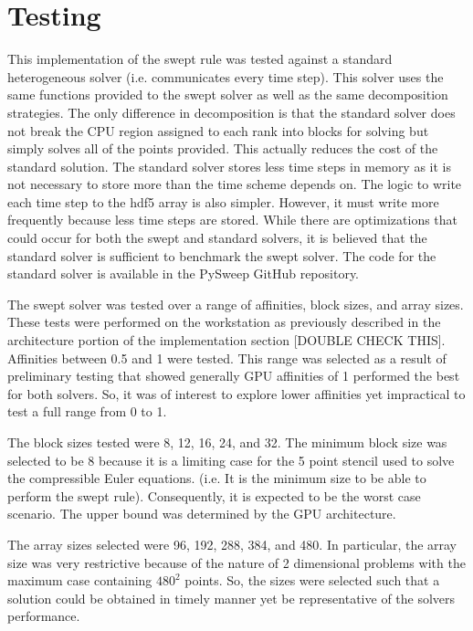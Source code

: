 \documentclass[review]{elsarticle}
\begin{document}
\section{Testing}
This implementation of the swept rule was tested against a standard heterogeneous solver (i.e. communicates every time step). This solver uses the same functions provided to the swept solver as well as the same decomposition strategies. The only difference in decomposition is that the standard solver does not break the CPU region assigned to each rank into blocks for solving but simply solves all of the points provided. This actually reduces the cost of the standard solution. The standard solver stores less time steps in memory as it is not necessary to store more than the time scheme depends on. The logic to write each time step to the hdf5 array is also simpler. However, it must write more frequently because less time steps are stored. While there are optimizations that could occur for both the swept and standard solvers, it is believed that the standard solver is sufficient to benchmark the swept solver. The code for the standard solver is available in the PySweep GitHub repository.

\par
The swept solver was tested over a range of affinities, block sizes, and array sizes. These tests were performed on the workstation as previously described in the architecture portion of the implementation section [DOUBLE CHECK THIS]. Affinities between 0.5 and 1 were tested. This range was selected as a result of preliminary testing that showed generally GPU affinities of 1 performed the best for both solvers. So, it was of interest to explore lower affinities yet impractical to test a full range from 0 to 1.

\par
The block sizes tested were 8, 12, 16, 24, and 32. The minimum block size was selected to be 8 because it is a limiting case for the 5 point stencil used to solve the compressible Euler equations. (i.e. It is the minimum size to be able to perform the swept rule). Consequently, it is expected to be the worst case scenario. The upper bound was determined by the GPU architecture.

\par
The array sizes selected were 96, 192, 288, 384, and 480. In particular, the array size was very restrictive because of the nature of 2 dimensional problems with the maximum case containing $480^2$ points. So, the sizes were selected such that a solution could be obtained in timely manner yet be representative of the solvers performance.
\end{document}
